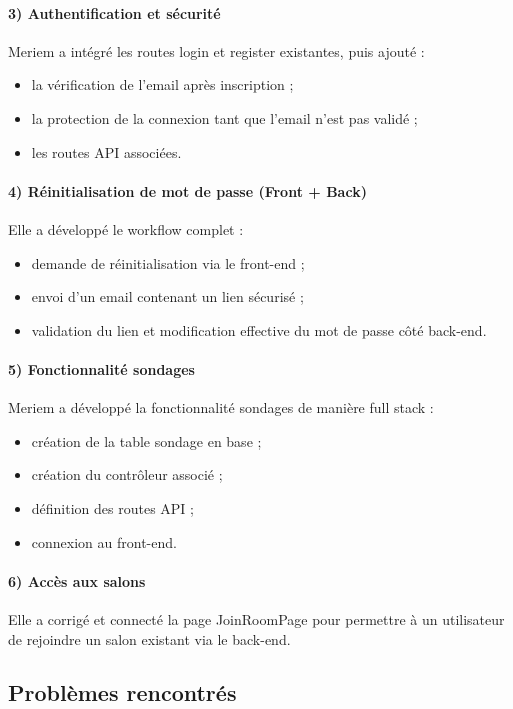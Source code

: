 \documentclass[12pt,a4paper]{report}
\begin{document}
\paragraph{3) Authentification et sécurité}
Meriem a intégré les routes login et register existantes, puis ajouté :
\begin{itemize}
  \item la vérification de l’email après inscription ;
  \item la protection de la connexion tant que l’email n’est pas validé ;
  \item les routes API associées.
\end{itemize}

\paragraph{4) Réinitialisation de mot de passe (Front + Back)}
Elle a développé le workflow complet :
\begin{itemize}
  \item demande de réinitialisation via le front-end ;
  \item envoi d’un email contenant un lien sécurisé ;
  \item validation du lien et modification effective du mot de passe côté back-end.
\end{itemize}

\paragraph{5) Fonctionnalité sondages}
Meriem a développé la fonctionnalité sondages de manière full stack :
\begin{itemize}
  \item création de la table sondage en base ;
  \item création du contrôleur associé ;
  \item définition des routes API ;
  \item connexion au front-end.
\end{itemize}

\paragraph{6) Accès aux salons}
Elle a corrigé et connecté la page JoinRoomPage pour permettre à un utilisateur de rejoindre un salon existant via le back-end.

\subsection*{Problèmes rencontrés}
\end{document}
